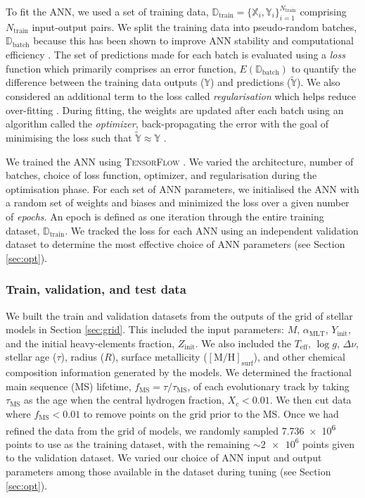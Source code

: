 \documentclass[a4paper,fleqn,usenatbib]{mnras}
\newcommand{\dnu}{\ensuremath{\Delta\nu}}
\newcommand{\metallicity}{\ensuremath{[\mathrm{M}/\mathrm{H}]}}
\newcommand{\teff}{\ensuremath{T_\mathrm{eff}}}
\newcommand{\mlt}{\ensuremath{{\alpha_\mathrm{MLT}}}}
\begin{document}
To fit the ANN, we used a set of training data, $\boldsymbol{\mathbb{D}}_\mathrm{train} = \{\boldsymbol{\mathbb{X}}_i, \boldsymbol{\mathbb{Y}}_i\}_{i=1}^{N_\mathrm{train}}$ comprising $N_\mathrm{train}$ input-output pairs. We split the training data into pseudo-random batches, $\boldsymbol{\mathbb{D}}_\mathrm{batch}$ because this has been shown to improve ANN stability and computational efficiency \citep{Masters.Luschi2018}. The set of predictions made for each batch is evaluated using a \emph{loss} function which primarily comprises an error function, $E(\boldsymbol{\mathbb{D}}_\mathrm{batch})$ to quantify the difference between the training data outputs ($\boldsymbol{\mathbb{Y}}$) and predictions ($\widetilde{\boldsymbol{\mathbb{Y}}}$). We also considered an additional term to the loss called \emph{regularisation} which helps reduce over-fitting \citep{Goodfellow.Bengio.ea2016}. During fitting, the weights are updated after each batch using an algorithm called the \emph{optimizer}, back-propagating the error with the goal of minimising the loss such that $\widetilde{\boldsymbol{\mathbb{Y}}} \approx \boldsymbol{\mathbb{Y}}$ \citep[see e.g.][]{Rumelhart.Hinton.ea1986}.

We trained the ANN using \textsc{TensorFlow} \citep{Abadi.Barham.ea2016}. We varied the architecture, number of batches, choice of loss function, optimizer, and regularisation during the optimisation phase. For each set of ANN parameters, we initialised the ANN with a random set of weights and biases and minimized the loss over a given number of \emph{epochs}. An epoch is defined as one iteration through the entire training dataset, $\boldsymbol{\mathbb{D}}_\mathrm{train}$. We tracked the loss for each ANN using an independent validation dataset to determine the most effective choice of ANN parameters (see Section \ref{sec:opt}).

\subsubsection{Train, validation, and test data}\label{sec:train}

We built the train and validation datasets from the outputs of the grid of stellar models in Section \ref{sec:grid}. This included the input parameters: $M$, $\mlt$, $Y_\mathrm{init}$, and the initial heavy-elements fraction, $Z_\mathrm{init}$. We also included the $\teff$, $\log g$, $\dnu$, stellar age ($\tau$), radius ($R$), surface metallicity ($\metallicity_\mathrm{surf}$), and other chemical composition information generated by the models. We determined the fractional main sequence (MS) lifetime, $f_{\mathrm{MS}} = \tau / \tau_{\mathrm{MS}}$, of each evolutionary track by taking $\tau_{\mathrm{MS}}$ as the age when the central hydrogen fraction, $X_c < 0.01$. We then cut data where $f_{\mathrm{MS}} < 0.01$ to remove points on the grid prior to the MS. Once we had refined the data from the grid of models, we randomly sampled \num{7.736e6} points to use as the training dataset, with the remaining $\sim \num{2e6}$ points given to the validation dataset. We varied our choice of ANN input and output parameters among those available in the dataset during tuning (see Section \ref{sec:opt}).
\end{document}
